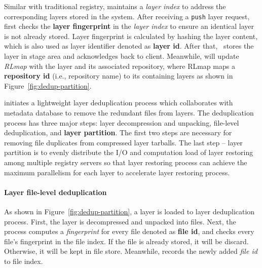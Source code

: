 Similar with traditional registry, 
\sysname maintains a \emph{layer index} to address the corresponding layers stored in the system.
After receiving a \texttt{push} layer request,
\sysname first checks the \textbf{layer fingerprint} in the \emph{layer index} to ensure 
an identical layer is not already stored.
Layer fingerprint is calculated by hashing the layer content, which is also used as layer identifier denoted as \textbf{layer id}.
After that, \sysname~stores the layer in stage area and acknowledges back to client. 
Meanwhile, \sysname will update \emph{RLmap} with the layer and its associated repository, where
RLmap maps a \textbf{repository id} (i.e., repository name) to its containing layers 
as shown in Figure~\ref{fig:dedup-partition}.
 
 \sysname initiates a lightweight layer deduplication process which collaborates with metadata database
 to remove the redundant files from layers. 
The deduplication process has three major steps: 
layer decompression and unpacking, 
file-level deduplication,
and \textbf{layer partition}. 
The first two steps are necessary for removing file duplicates from compressed layer tarballs.
The last step -- layer partition is to evenly distribute the I/O and computation load of layer restoring among multiple registry servers   
so that layer restoring process can achieve the maximum parallelism for each layer to
accelerate layer restoring process. 


%
\paragraph{Layer file-level deduplication}
As shown in Figure~\ref{fig:dedup-partition}, 
a layer is loaded to layer deduplication process.
First, the layer is decompressed and unpacked into files.
Next, 
the process computes a \emph{fingerprint} for every file denoted as \textbf{file id}, 
and checks every file's fingerprint in the file index.
If the file is already stored, it will be discard. 
Otherwise, it will be kept in file store.
Meanwhile,
\sysname  records the newly added \emph{file id} to file index.
